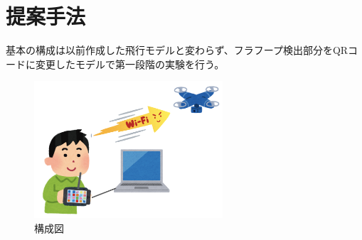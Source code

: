 \section{提案手法}
基本の構成は以前作成した飛行モデルと変わらず、フラフープ検出部分をQRコードに変更したモデルで第一段階の実験を行う。

\begin{figure}[htbp]
  \begin{center}
    \includegraphics[clip,width=7.0cm]{img/sys-struct.png}
    \caption{構成図}
    \label{fig:struct}
  \end{center}
\end{figure}
